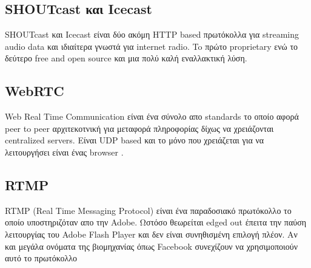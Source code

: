 \documentclass[hidelinks, 12pt, a4paper]{article}
\begin{document}
\subsection{SHOUTcast και Icecast}

SHOUTcast και Icecast είναι δύο ακόμη HTTP based πρωτόκολλα για streaming audio data και ιδιαίτερα γνωστά για internet radio. To πρώτο proprietary ενώ το δεύτερο free and open source και μια πολύ καλή εναλλακτική λύση.

\subsection{WebRTC}

Web Real Time Communication είναι ένα σύνολο απο standards το οποίο αφορά peer to peer αρχιτεκοτνική για μεταφορά πληροφορίας δίχως να χρειάζονται centralized servers. Είναι UDP based και το μόνο που χρειάζεται για να λειτουργήσει είναι ένας browser \cite{webrtc}.

\subsection{RTMP}

RTMP (Real Time Messaging Protocol) είναι ένα παραδοσιακό πρωτόκολλο το οποίο υποστηριζόταν απο την Adobe. Ωστόσο θεωρείται edged out έπειτα την παύση λειτουργίας του Adobe Flash Player και δεν είναι συνηθισμένη επιλογή πλέον. Αν και μεγάλα ονόματα της βιομηχανίας όπως Facebook συνεχίζουν να χρησιμοποιούν αυτό το πρωτόκολλο \cite{streamingmedia}


\clearpage



\end{document}
